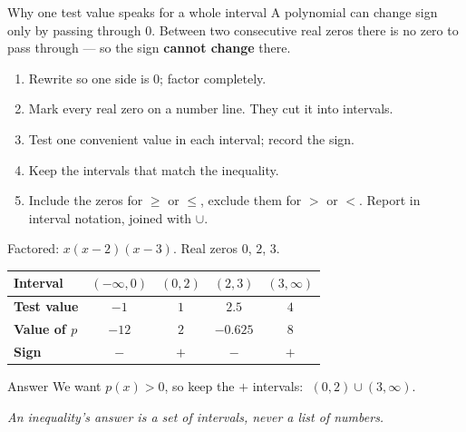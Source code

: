 \documentclass[aspectratio=169, 11pt]{beamer}
\begin{document}
\begin{frame}[t, plain]

  \begin{block}{Why one test value speaks for a whole interval}
    A polynomial can change sign only by passing through \(0\). Between two
    consecutive real zeros there is no zero to pass through --- so the sign
    \textbf{cannot change} there.
  \end{block}

  \bigskip
  \begin{enumerate}\setlength{\itemsep}{7pt}
    \item Rewrite so one side is \(0\); factor completely.
    \item Mark every real zero on a number line. They cut it into intervals.
    \item Test one convenient value in each interval; record the sign.
    \item Keep the intervals that match the inequality.
    \item Include the zeros for \(\ge\) or \(\le\), exclude them for \(>\) or
          \(<\). Report in interval notation, joined with \(\cup\).
  \end{enumerate}
\end{frame}

\begin{frame}[t, plain]

  Factored: \(x(x-2)(x-3)\). Real zeros \(0\), \(2\), \(3\).

  \bigskip
  \begin{center}
  \renewcommand{\arraystretch}{1.4}
  \begin{tabular}{|l|c|c|c|c|}
  \hline
  \textbf{Interval} & \((-\infty,0)\) & \((0,2)\) & \((2,3)\) & \((3,\infty)\) \\
  \hline
  \textbf{Test value} & \(-1\) & \(1\) & \(2.5\) & \(4\) \\
  \hline
  \textbf{Value of \(p\)} & \(-12\) & \(2\) & \(-0.625\) & \(8\) \\
  \hline
  \textbf{Sign} & \(-\) & \(+\) & \(-\) & \(+\) \\
  \hline
  \end{tabular}
  \end{center}

  \bigskip
  \begin{block}{Answer}
    We want \(p(x) > 0\), so keep the \(+\) intervals:
    \(\;(0,2) \cup (3,\infty)\).
  \end{block}

  \bigskip
  \textit{An inequality's answer is a set of intervals, never a list of
  numbers.}
\end{frame}
\end{document}
